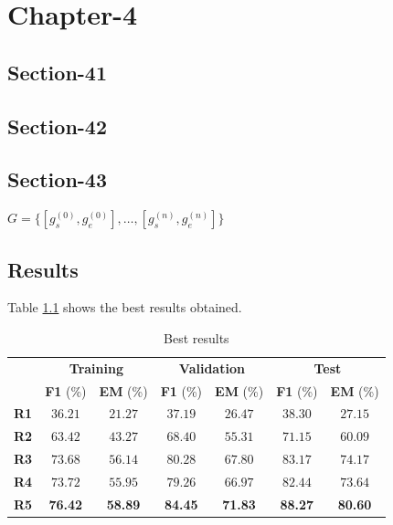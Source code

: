 \documentclass[a4paper,10pt]{report}
\begin{document}
\chapter{Chapter-4}\label{chap:chapter-4}
\section{Section-41}\label{sec:section-41}

\blindtext %



\section{Section-42}\label{sec:section-42}

\blindtext %



\section{Section-43}\label{sec:section-43}
$G=\{[g_s^{(0)},g_e^{(0)}], \dots, [g_s^{(n)},g_e^{(n)}]\}$
\blindtext %




\section{Results}\label{sec:results}
Table \ref{table:results} shows the best results obtained.

\begin{table}[h]
  \center
  \begin{tabular}{|c|c|c|c|c|c|c|}
    \hline
    \multirow{2}{*}{}   & \multicolumn{2}{c|}{\textbf{Training}} & \multicolumn{2}{c|}{\textbf{Validation}} & \multicolumn{2}{c|}{\textbf{Test}}                                                          \\ \cline{2-7}
                        & \textbf{F1} (\%) & \textbf{EM} (\%) & \textbf{F1} (\%) & \textbf{EM} (\%) & \textbf{F1} (\%) & \textbf{EM} (\%) \\ \hline
    \textbf{R1}   & $36.21$ & $21.27$ & $37.19$ & $26.47$ & $38.30$ & $27.15$ \\ \hline
    \textbf{R2}      & $63.42$ & $43.27$ & $68.40$ & $55.31$ & $71.15$ & $60.09$ \\ \hline
    \textbf{R3}       & $73.68$ & $56.14$ & $80.28$ & $67.80$ & $83.17$ & $74.17$ \\ \hline
    \textbf{R4} & $73.72$ & $55.95$ & $79.26$ & $66.97$ & $82.44$ & $73.64$ \\ \hline
    \textbf{R5}    & \textbf{76.42} & \textbf{58.89} & \textbf{84.45} & \textbf{71.83} & \textbf{88.27} & \textbf{80.60} \\ \hline
  \end{tabular}
  \caption{Best results}
  \label{table:results}
\end{table}
\end{document}
